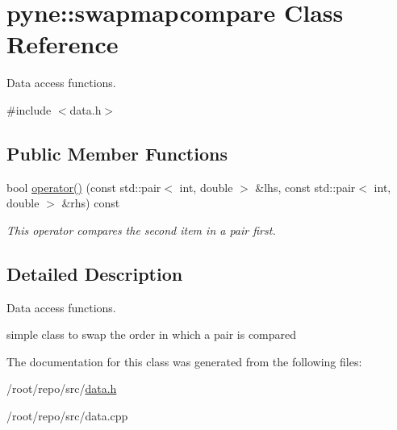 \hypertarget{classpyne_1_1swapmapcompare}{}\section{pyne\+:\+:swapmapcompare Class Reference}
\label{classpyne_1_1swapmapcompare}


Data access functions.  




{\ttfamily \#include $<$data.\+h$>$}

\subsection*{Public Member Functions}
\begin{DoxyCompactItemize}
\item 
\mbox{\label{classpyne_1_1swapmapcompare_adc68bcf8e84fdc94783114675bb2dd37}} 
bool \hyperlink{classpyne_1_1swapmapcompare_adc68bcf8e84fdc94783114675bb2dd37}{operator()} (const std\+::pair$<$ int, double $>$ \&lhs, const std\+::pair$<$ int, double $>$ \&rhs) const
\begin{DoxyCompactList}\small\item\em This operator compares the second item in a pair first. \end{DoxyCompactList}\end{DoxyCompactItemize}


\subsection{Detailed Description}
Data access functions. 

simple class to swap the order in which a pair is compared 

The documentation for this class was generated from the following files\+:\begin{DoxyCompactItemize}
\item 
/root/repo/src/\hyperlink{data_8h}{data.\+h}\item 
/root/repo/src/data.\+cpp\end{DoxyCompactItemize}
